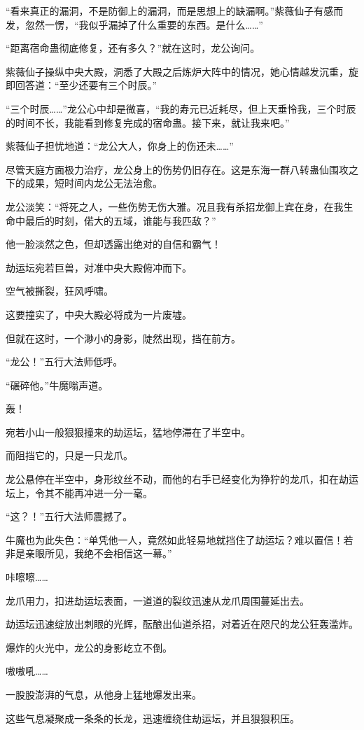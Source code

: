 \begin{this_body}
“看来真正的漏洞，不是防御上的漏洞，而是思想上的缺漏啊。”紫薇仙子有感而发，忽然一愣，“我似乎漏掉了什么重要的东西。是什么……”

“距离宿命蛊彻底修复，还有多久？”就在这时，龙公询问。

紫薇仙子操纵中央大殿，洞悉了大殿之后炼炉大阵中的情况，她心情越发沉重，旋即回答道：“至少还要有三个时辰。”

“三个时辰……”龙公心中却是微喜，“我的寿元已近耗尽，但上天垂怜我，三个时辰的时间不长，我能看到修复完成的宿命蛊。接下来，就让我来吧。”

紫薇仙子担忧地道：“龙公大人，你身上的伤还未……”

尽管天庭方面极力治疗，龙公身上的伤势仍旧存在。这是东海一群八转蛊仙围攻之下的成果，短时间内龙公无法治愈。

龙公淡笑：“将死之人，一些伤势无伤大雅。况且我有杀招龙御上宾在身，在我生命中最后的时刻，偌大的五域，谁能与我匹敌？”

他一脸淡然之色，但却透露出绝对的自信和霸气！

劫运坛宛若巨兽，对准中央大殿俯冲而下。

空气被撕裂，狂风呼啸。

这要撞实了，中央大殿必将成为一片废墟。

但就在这时，一个渺小的身影，陡然出现，挡在前方。

“龙公！”五行大法师低呼。

“碾碎他。”牛魔嗡声道。

轰！

宛若小山一般狠狠撞来的劫运坛，猛地停滞在了半空中。

而阻挡它的，只是一只龙爪。

龙公悬停在半空中，身形纹丝不动，而他的右手已经变化为狰狞的龙爪，扣在劫运坛上，令其不能再冲进一分一毫。

“这？！”五行大法师震撼了。

牛魔也为此失色：“单凭他一人，竟然如此轻易地就挡住了劫运坛？难以置信！若非是亲眼所见，我绝不会相信这一幕。”

咔嚓嚓……

龙爪用力，扣进劫运坛表面，一道道的裂纹迅速从龙爪周围蔓延出去。

劫运坛迅速绽放出刺眼的光辉，酝酿出仙道杀招，对着近在咫尺的龙公狂轰滥炸。

爆炸的火光中，龙公的身影屹立不倒。

嗷嗷吼……

一股股澎湃的气息，从他身上猛地爆发出来。

这些气息凝聚成一条条的长龙，迅速缠绕住劫运坛，并且狠狠积压。


\end{this_body}
